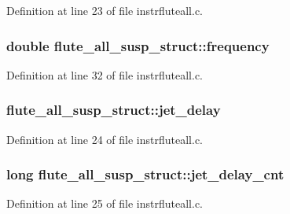 Definition at line 23 of file instrfluteall.\+c.

\subsubsection[{\texorpdfstring{frequency}{frequency}}]{\setlength{\rightskip}{0pt plus 5cm}double flute\+\_\+all\+\_\+susp\+\_\+struct\+::frequency}\hypertarget{structflute__all__susp__struct_a9f88ec7deb7b5e635f67f5a29a118fbf}{}\label{structflute__all__susp__struct_a9f88ec7deb7b5e635f67f5a29a118fbf}


Definition at line 32 of file instrfluteall.\+c.

\subsubsection[{\texorpdfstring{jet\+\_\+delay}{jet_delay}}]{ flute\+\_\+all\+\_\+susp\+\_\+struct\+::jet\+\_\+delay}\hypertarget{structflute__all__susp__struct_ab1ba54af0fcdb71c915b7fa60d30fceb}{}\label{structflute__all__susp__struct_ab1ba54af0fcdb71c915b7fa60d30fceb}


Definition at line 24 of file instrfluteall.\+c.

\subsubsection[{\texorpdfstring{jet\+\_\+delay\+\_\+cnt}{jet_delay_cnt}}]{\setlength{\rightskip}{0pt plus 5cm}long flute\+\_\+all\+\_\+susp\+\_\+struct\+::jet\+\_\+delay\+\_\+cnt}\hypertarget{structflute__all__susp__struct_a05c90bbb9badc7f86bc38adbf0c5c97d}{}\label{structflute__all__susp__struct_a05c90bbb9badc7f86bc38adbf0c5c97d}


Definition at line 25 of file instrfluteall.\+c.

